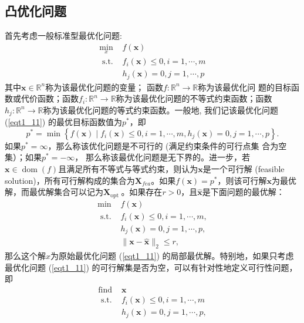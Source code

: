 \subsection{凸优化问题}
首先考虑一般标准型最优化问题:
\begin{equation}
\begin{array}{ll}
\min _{x} & f(\bm{x}) \\
\text { s.t. } & f_{i}(\bm{x}) \leq 0, i=1, \cdots, m \\
& h_{j}(\bm{x})=0, j=1, \cdots, p
\end{array}
\label{eqt1_11}
\end{equation}
其中$  \bm{x} \in \mathbb{R}^{n}  $称为该最优化问题的变量； 函数$  f: \mathbb{R}^{n} \rightarrow \mathbb{R}  $称为该最优化问 题的目标函数或代价函数；函数$ f_{i}: \mathbb{R}^{n} \rightarrow \mathbb{R}$称为该最优化问题的不等式约束函数；函数$  h_{j}: \mathbb{R}^{n} \rightarrow \mathbb{R}$称为该最优化问题的等式约束函数。一般地, 我们记该最优化问题 (\ref{eqt1_11}) 的最优目标函数值为$  p^{*} $，即
\begin{equation}
p^{*}=\min \left\{f(\bm{x}) \mid f_{i}(\bm{x}) \leq 0, i=1, \cdots, m, h_{j}(\bm{x})=0, j=1, \cdots, p\right\} .
    \nonumber
\end{equation}
如果$  p^{*}=\infty $，那么称该优化问题是不可行的 (满足约束条件的可行点集 合为空集）；如果$  p^{*}=-\infty $， 那么称该最优化问题是无下界的\cite{2004Convex}。进一步，若$  \bm{x} \in \operatorname{dom}(f)  $且满足所有不等式与等式约束，则认为$ \bm{x}  $是一个可行解 (feasible solution)，所有可行解构成的集合为$\bm{X}_{f e a}$。如果$  f(\bm{x})=p^{*} $，则该可行解$  \bm{x}  $为最优解，而最优解集合可以记为$\bm{X}_{\text {opt }}  $。如果存在$  r>0 $，且$  \hat{\bm{x}}  $是下面问题的最优解：
\begin{equation}
\begin{array}{ll}
\min & f(\bm{x}) \\
\text { s.t. } & f_{i}(\bm{x}) \leq 0, i=1, \cdots, m, \\
& h_{j}(\bm{x})=0, j=1, \cdots, p, \\
& \|\bm{x}-\hat{\bm{x}}\|_{2} \leq r,
\end{array}
    \nonumber
\end{equation}
那么这个解$  \hat{x}  $为原始最优化问题 (\ref{eqt1_11}) 的局部最优解。特别地，如果只考虑最优化问题 (\ref{eqt1_11}) 的可行解集是否为空，可以有针对性地定义可行性问题，即 
\begin{equation}
\begin{array}{ll}
\text{find } & \bm{x}  \\
\text { s.t. } & f_{i}(\bm{x}) \leq 0, i=1, \cdots, m \\
& h_{j}(\bm{x})=0, j=1, \cdots, p,
\end{array}
    \nonumber
\end{equation}
